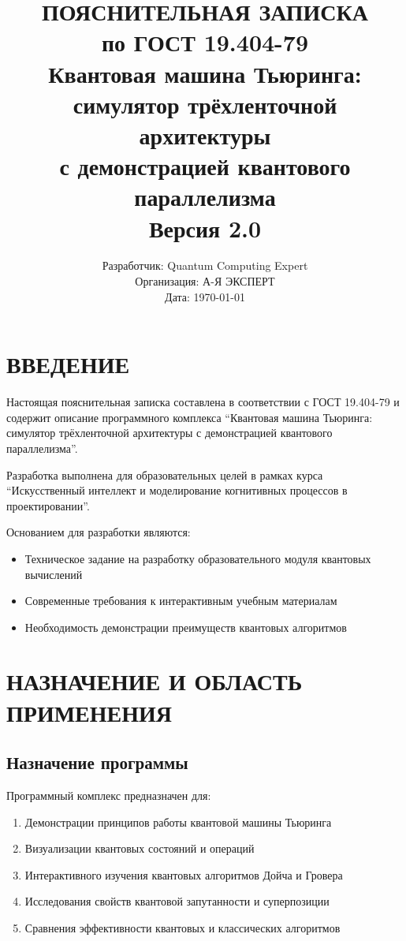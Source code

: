 \documentclass[14pt,russian]{extarticle}
\title{%
    ПОЯСНИТЕЛЬНАЯ ЗАПИСКА \\
    \large по ГОСТ 19.404-79 \\
    \vspace{1em}
    \LARGE Квантовая машина Тьюринга: \\
    симулятор трёхленточной архитектуры \\
    с демонстрацией квантового параллелизма \\
    \vspace{1em}
    \large Версия 2.0
}
\author{
    Разработчик: Quantum Computing Expert \\
    Организация: А-Я ЭКСПЕРТ \\
    Дата: \today
}
\date{}
\begin{document}
\maketitle
\thispagestyle{empty}

\newpage
\tableofcontents
\newpage

\section{ВВЕДЕНИЕ}

Настоящая пояснительная записка составлена в соответствии с ГОСТ 19.404-79 
и содержит описание программного комплекса ``Квантовая машина Тьюринга: 
симулятор трёхленточной архитектуры с демонстрацией квантового параллелизма''.

Разработка выполнена для образовательных целей в рамках курса 
``Искусственный интеллект и моделирование когнитивных процессов в проектировании''.

Основанием для разработки являются:
\begin{itemize}
    \item Техническое задание на разработку образовательного модуля квантовых вычислений
    \item Современные требования к интерактивным учебным материалам
    \item Необходимость демонстрации преимуществ квантовых алгоритмов
\end{itemize}

\section{НАЗНАЧЕНИЕ И ОБЛАСТЬ ПРИМЕНЕНИЯ}

\subsection{Назначение программы}

Программный комплекс предназначен для:
\begin{enumerate}
    \item Демонстрации принципов работы квантовой машины Тьюринга
    \item Визуализации квантовых состояний и операций
    \item Интерактивного изучения квантовых алгоритмов Дойча и Гровера
    \item Исследования свойств квантовой запутанности и суперпозиции
    \item Сравнения эффективности квантовых и классических алгоритмов
\end{enumerate}
\end{document}
